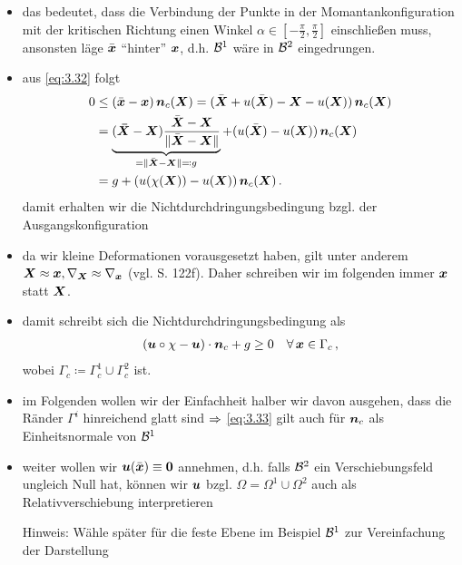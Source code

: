 \begin{itemize}
\item das bedeutet, dass die Verbindung der Punkte in der Momantankonfiguration mit der kritischen Richtung einen Winkel $\alpha \in [-\frac \pi2,\frac \pi2]$ einschließen muss, ansonsten läge $\bar{\boldsymbol x}$ "`hinter"' $\boldsymbol x$, d.h. $\mathcal B^1$ wäre in $\mathcal B^2$ eingedrungen. 

\item aus \eqref{eq:3.32} folgt
\begin{align*}
	0 &  \le (\bar{\boldsymbol x} - \boldsymbol x) \, \boldsymbol n_c (\boldsymbol X) = (\bar{\boldsymbol X} + u(\bar{\boldsymbol X}) -{\boldsymbol X} - u({\boldsymbol X})) \, \boldsymbol n_c(\boldsymbol X) \\
	& = \underbrace{(\boldsymbol{\bar X} - \boldsymbol X) \frac{\bar{\boldsymbol X}-\boldsymbol X}{\lVert \bar{\boldsymbol X}-\boldsymbol X\rVert}}_{ = \lVert \bar{\boldsymbol X}-\boldsymbol X\rVert\eqqcolon g} + ( u(\bar{\boldsymbol X})  - u({\boldsymbol X})) \, \boldsymbol n_c(\boldsymbol X) \\
	& = g + ( u(\chi(\boldsymbol X))  - u({\boldsymbol X})) \, \boldsymbol n_c(\boldsymbol X) \, .
\end{align*}
damit erhalten wir die Nichtdurchdringungsbedingung bzgl. der Ausgangskonfiguration

\item da wir kleine Deformationen vorausgesetzt haben, gilt unter anderem $\boldsymbol X \approx \boldsymbol x,  \nabla_{\boldsymbol X} \approx \nabla_{\boldsymbol x}$ (vgl. \cite{AltKonti} S. 122f). Daher schreiben wir im folgenden immer $\boldsymbol x$ statt $\boldsymbol X$.

\item damit schreibt sich die Nichtdurchdringungsbedingung als
\begin{align}\label{eq:3.33}
	(\boldsymbol u \circ \chi -\boldsymbol u) \cdot \boldsymbol n_c + g \ge 0 \quad \forall \, \boldsymbol x \in \Gamma_c \, ,
\end{align}
wobei $\Gamma_c \coloneqq \Gamma_c^1 \cup \Gamma_c^2$ ist.
	
\item im Folgenden wollen wir der Einfachheit halber wir davon ausgehen, dass die Ränder $\Gamma^i$ hinreichend glatt sind $\Rightarrow$ \eqref{eq:3.33} gilt auch für $\boldsymbol n_c$ als Einheitsnormale von $\mathcal B^1$

\item weiter wollen wir $\boldsymbol u(\bar{\boldsymbol x})\equiv \boldsymbol 0$ annehmen, d.h. falls $\mathcal B^2$ ein Verschiebungsfeld ungleich Null hat, können wir $\boldsymbol u$ bzgl. $\Omega = \Omega^1\cup\Omega^2$ auch als Relativverschiebung interpretieren

\item[Hinweis:] Wähle später für die feste Ebene im Beispiel $\mathcal B^1$ zur Vereinfachung der Darstellung


\end{itemize}
